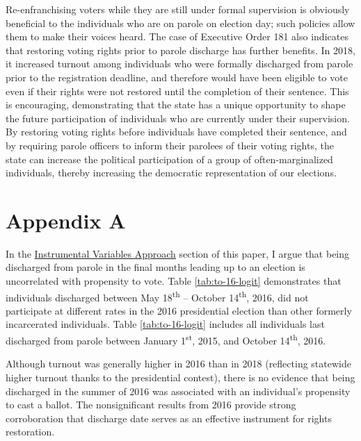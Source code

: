 \documentclass[
  12pt,
]{article}
\begin{document}
Re-enfranchising voters while they are still under formal supervision is obviously beneficial to the individuals who are on parole on election day; such policies allow them to make their voices heard. The case of Executive Order 181 also indicates that restoring voting rights prior to parole discharge has further benefits. In 2018, it increased turnout among individuals who were formally discharged from parole prior to the registration deadline, and therefore would have been eligible to vote even if their rights were not restored until the completion of their sentence. This is encouraging, demonstrating that the state has a unique opportunity to shape the future participation of individuals who are currently under their supervision. By restoring voting rights before individuals have completed their sentence, and by requiring parole officers to inform their parolees of their voting rights, the state can increase the political participation of a group of often-marginalized individuals, thereby increasing the democratic representation of our elections.

\newpage
\setcounter{table}{0}  \renewcommand{\thetable}{A\arabic{table}} \setcounter{figure}{0} \renewcommand{\thefigure}{A\arabic{figure}}

\hypertarget{appendix-a}{%
\section*{Appendix A}\label{appendix-a}}

In the \protect\hyperlink{instrumental-variables-approach}{Instrumental Variables Approach} section of this paper, I argue that being discharged from parole in the final months leading up to an election is uncorrelated with propensity to vote. Table \ref{tab:to-16-logit} demonstrates that individuals discharged between May 18\textsuperscript{th} -- October 14\textsuperscript{th}, 2016, did not participate at different rates in the 2016 presidential election than other formerly incarcerated individuals. Table \ref{tab:to-16-logit} includes all individuals last discharged from parole between January 1\textsuperscript{st}, 2015, and October 14\textsuperscript{th}, 2016.

\begin{singlespace}


\end{singlespace}

Although turnout was generally higher in 2016 than in 2018 (reflecting statewide higher turnout thanks to the presidential contest), there is no evidence that being discharged in the summer of 2016 was associated with an individual's propensity to cast a ballot. The nonsignificant results from 2016 provide strong corroboration that discharge date serves as an effective instrument for rights restoration.
\end{document}
